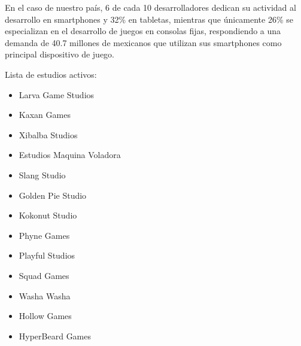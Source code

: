 En el caso de nuestro país, 6 de cada 10 desarrolladores dedican su actividad al desarrollo en smartphones y 32\% en tabletas, mientras que únicamente 26\% se especializan en el desarrollo de juegos en consolas fijas, respondiendo a una demanda de 40.7 millones de mexicanos que utilizan sus smartphones como principal dispositivo de juego.

Lista de estudios activos:
\begin{itemize}
	\item Larva Game Studios
	\item Kaxan Games
	\item Xibalba Studios
	\item Estudios Maquina Voladora
	\item Slang Studio
	\item Golden Pie Studio
	\item Kokonut Studio
	\item Phyne Games
	\item Playful Studios
	\item Squad Games
	\item Washa Washa
	\item Hollow Games
	\item HyperBeard Games
	
\end{itemize}
